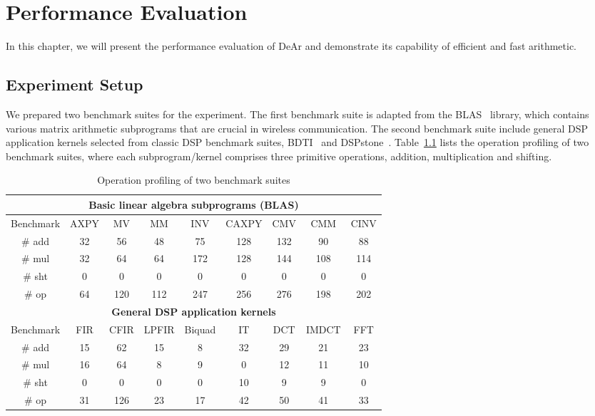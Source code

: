\chapter{Performance Evaluation}
In this chapter, we will present the performance evaluation of DeAr and demonstrate its capability of efficient and fast arithmetic.
\section{Experiment Setup}
\label{sec:evaluation:setup}
We prepared two benchmark suites for the experiment.
The first benchmark suite is adapted from the BLAS~\cite{blas} library, 
which contains various matrix arithmetic subprograms that are crucial in wireless communication.
The second benchmark suite include general DSP application kernels selected from classic DSP benchmark suites, BDTI~\cite{btdi} and DSPstone~\cite{dspstone}.
Table~\ref{tab:op} lists the operation profiling of two benchmark suites, 
where each subprogram/kernel comprises three primitive operations, addition, multiplication and shifting.
\begin{table}[!ht]
    \centering
    \caption{Operation profiling of two benchmark suites}
    \label{tab:op}
    \resizebox{\columnwidth}{!}
    {
        \begin{tabular}{|c|c|c|c|c|c|c|c|c|}
            \hline
            \multicolumn{9}{|c|}{\textbf{Basic linear algebra subprograms (BLAS)}} \\ \hline
            Benchmark              & AXPY   & MV     & MM      & INV      & CAXPY  & CMV  & CMM    & CINV  \\ \hline
            \# add            &  32    &  56    &   48    &    75    &  128   & 132  &   90   &  88   \\ \hline
            \# mul            &  32    &  64    &   64    &   172    &  128   & 144  &  108   & 114   \\ \hline
            \# sht            &   0    &   0    &    0    &     0    &    0   &   0  &    0   &   0   \\ \hline
            \# op             &  64    & 120    &  112    &   247    &  256   & 276  &  198   & 202   \\ \hline
            \multicolumn{9}{|c|}{\textbf{General DSP application kernels}}                     \\ \hline
            Benchmark              & FIR    & CFIR   & LPFIR   & Biquad   & IT     & DCT  & IMDCT  & FFT   \\ \hline
            \# add            & 15     &  62    &   15    &    8     &  32    &  29  &   21   &  23   \\ \hline
            \# mul            & 16     &  64    &    8    &    9     &   0    &  12  &   11   &  10   \\ \hline
            \# sht            &  0     &   0    &    0    &    0     &  10    &   9  &    9   &   0   \\ \hline
            \# op             & 31     & 126    &   23    &   17     &  42    &  50  &   41   &  33   \\ \hline
        \end{tabular}
    }
\end{table}
